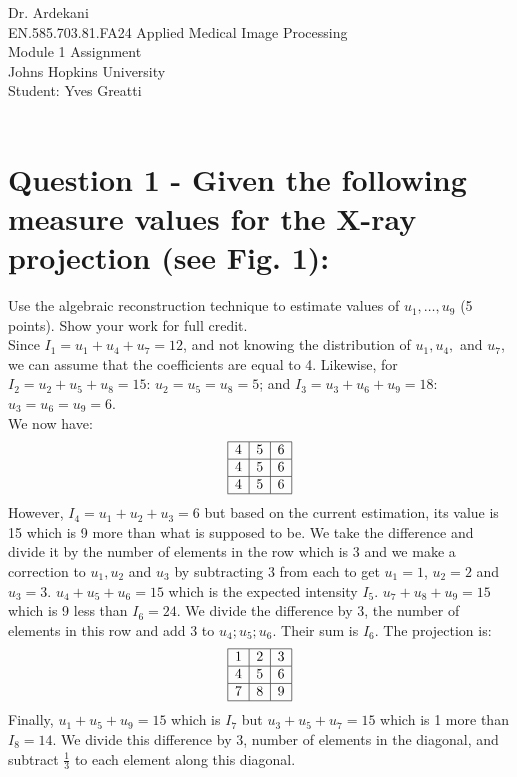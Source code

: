 \documentclass[12pt,twoside]{article}
\begin{document}
\noindent Dr. Ardekani\\
EN.585.703.81.FA24 Applied Medical Image Processing\\
Module 1 Assignment\\
Johns Hopkins University\\
Student: Yves Greatti\\\


\section*{Question 1 - Given the following measure values for the X-ray projection (see Fig. 1):}
\be
    \item Use the algebraic reconstruction technique to estimate values of \( u_1, \ldots, u_9 \) (5 points). Show your work for full credit.\\
    Since \( I_1 = u_1 + u_4 + u_7 = 12 \), and not knowing the distribution of \( u_1, u_4, \) and \( u_7 \), 
    we can assume that the coefficients are equal to 4. Likewise, for \( I_2 = u_2 + u_5 + u_8 = 15 \): \( u_2=u_5=u_8=5 \); and  \( I_3 = u_3+ u_6 + u_9 = 18 \): \( u_3=u_6=u_9=6 \). \\
  We now have:\\
  \[
\begin{array}{|c|c|c|}
\hline
4 & 5 & 6 \\
\hline
4 & 5 & 6 \\
\hline
4 & 5 & 6 \\
\hline
\end{array}
\]
However,  \( I_4 = u_1 + u_2+ u_3 = 6 \) but based on the current estimation, its value is 15 which is 9 more than what is supposed to be.  We take the difference and divide it by the number of elements in the row 
which is 3 and we make a correction to \( u_1, u_2 \) and \(u_3\) by subtracting 3 from each to get $u_1=1$, $u_2=2$ and $u_3=3$. 
$u_4 + u_5 + u_6 = 15$ which is the expected intensity $I_5$.  
$u_7+ u_8 + u_9 = 15$ which is 9 less than $I_6=24$. We divide the difference by 3, the number of elements in this row and add 3 to $u_4; u_5 ; u_6 $.
Their sum is $I_6$. The projection is:
 \[
\begin{array}{|c|c|c|}
\hline
1 & 2 & 3 \\
\hline
4 & 5 & 6 \\
\hline
7 & 8 & 9 \\
\hline
\end{array}
\]
Finally, $u_1+ u_5 + u_9 = 15$ which is $I_7$ but $u_3 + u_5 + u_7 = 15$ which is 1 more than $I_8=14$. 
We  divide this difference by 3, number of elements in the diagonal, and subtract $\frac{1}{3}$ to each element along this diagonal.
\end{document}
